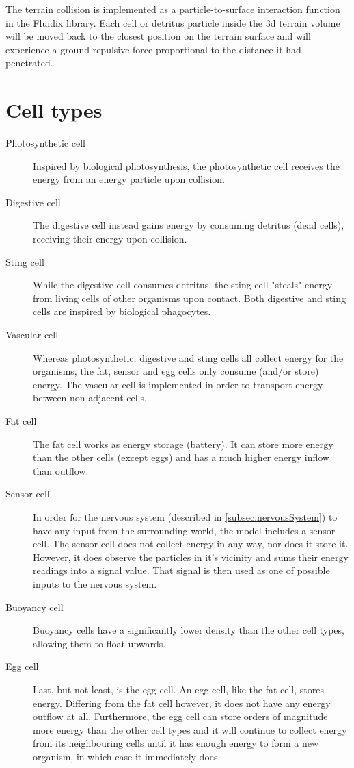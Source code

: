 The terrain collision is implemented as a particle-to-surface interaction function in the Fluidix library. Each cell or detritus particle inside the 3d terrain volume will be moved back to the closest position on the terrain surface and will experience a ground repulsive force proportional to the distance it had penetrated.

\section{Cell types}
\begin{description}
    \item [Photosynthetic cell] Inspired by biological photosynthesis, the photosynthetic cell receives the energy from an energy particle upon collision.
    \item [Digestive cell] %
    The digestive cell instead gains energy by consuming detritus (dead cells), receiving their energy upon collision.
    \item [Sting cell] %
    While the digestive cell consumes detritus, the sting cell "steals" energy from living cells of other organisms upon contact. Both digestive and sting cells are inspired by biological phagocytes.
    \item [Vascular cell] Whereas photosynthetic, digestive and sting cells all collect energy for the organisms, the fat, sensor and egg cells only consume (and/or store) energy. The vascular cell is implemented in order to transport energy between non-adjacent cells.
    \item [Fat cell] The fat cell works as energy storage (battery). It can store more energy than the other cells (except eggs) and has a much higher energy inflow than outflow.
    \item [Sensor cell] In order for the nervous system (described in \ref{subsec:nervousSystem}) to have any input from the surrounding world, the model includes a sensor cell. The sensor cell does not collect energy in any way, nor does it store it. However, it does observe the particles in it's vicinity and sums their energy readings into a signal value. That signal is then used as one of possible inputs to the nervous system.
    \item [Buoyancy cell] Buoyancy cells have a significantly lower density than the other cell types, allowing them to float upwards. 
    \item [Egg cell] Last, but not least, is the egg cell. An egg cell, like the fat cell, stores energy. Differing from the fat cell however, it does not have any energy outflow at all. Furthermore, the egg cell can store orders of magnitude more energy than the other cell types and it will continue to collect energy from its neighbouring cells until it has enough energy to form a new organism, in which case it immediately does.
\end{description}


